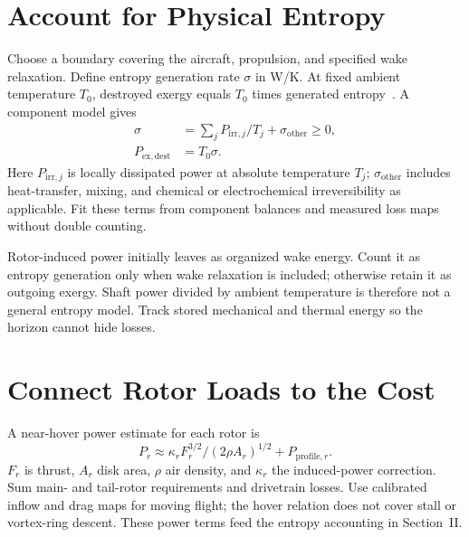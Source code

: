 \section{Account for Physical Entropy}
Choose a boundary covering the aircraft, propulsion, and specified wake
relaxation. Define entropy generation rate $\sigma$ in W/K. At fixed ambient
temperature $T_0$, destroyed exergy equals $T_0$ times generated
entropy~\cite{philipp2024}. A component model gives
\begin{equation}
\begin{aligned}
\sigma&=\sum_j P_{\mathrm{irr},j}/T_j+\sigma_{\mathrm{other}}\geq 0,\\
P_{\mathrm{ex,dest}}&=T_0\sigma.
\end{aligned}
\end{equation}
Here $P_{\mathrm{irr},j}$ is locally dissipated power at absolute temperature
$T_j$; $\sigma_{\mathrm{other}}$ includes heat-transfer, mixing, and chemical
or electrochemical irreversibility as applicable. Fit these terms from
component balances and measured loss maps without double counting.

Rotor-induced power initially leaves as organized wake energy. Count it as
entropy generation only when wake relaxation is included; otherwise retain
it as outgoing exergy. Shaft power divided by ambient temperature is
therefore not a general entropy model. Track stored mechanical and thermal
energy so the horizon cannot hide losses.

\section{Connect Rotor Loads to the Cost}
A near-hover power estimate for each rotor is~\cite{johnson2015}
\begin{equation}
P_r\approx\kappa_r F_r^{3/2}/(2\rho A_r)^{1/2}+P_{\mathrm{profile},r}.
\end{equation}
$F_r$ is thrust, $A_r$ disk area, $\rho$ air density, and $\kappa_r$ the
induced-power correction. Sum main- and tail-rotor requirements and
drivetrain losses. Use calibrated inflow and drag maps for moving flight;
the hover relation does not cover stall or vortex-ring descent. These power
terms feed the entropy accounting in Section~II.

